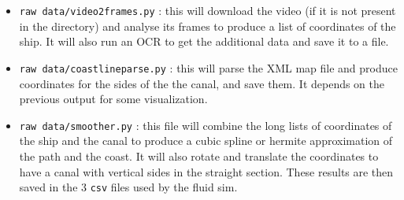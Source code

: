 \documentclass[a4paper]{article}
\begin{document}
\begin{itemize}
    \item \texttt{raw data/video2frames.py} : this will download the video (if it is not present in the directory) and analyse its frames to produce a list of coordinates of the ship. It will also run an OCR to get the additional data and save it to a file.
    \item \texttt{raw data/coastlineparse.py} : this will parse the XML map file and produce coordinates for the sides of the the canal, and save them. It depends on the previous output for some visualization.
    \item \texttt{raw data/smoother.py} : this file will combine the long lists of coordinates of the ship and the canal to produce a cubic spline or hermite approximation of the path and the coast. It will also rotate and translate the coordinates to have a canal with vertical sides in the straight section. These results are then saved in the 3 \texttt{csv} files used by the fluid sim.
\end{itemize} 
\end{document}

